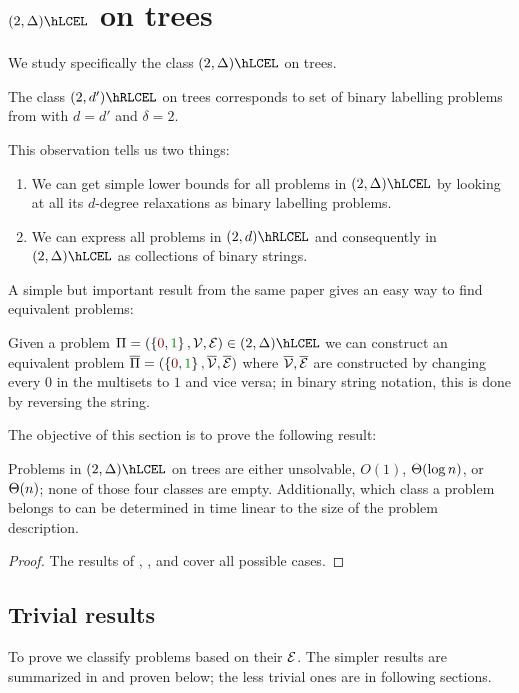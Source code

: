 \documentclass[12pt,a4paper]{article}
\begin{document}
\section{\texorpdfstring{$(2,\Delta)\hLCEL$}{2,delta-LCEL} on trees}
We study specifically the class $(2,\Delta)\hLCEL$ on trees.
\begin{obs}
    The class $(2,d')\hRLCEL$ on trees corresponds to set of binary labelling problems from \cite{balliu-2019} with $d=d'$ and $\delta=2$. 
\end{obs}
This observation tells us two things:
\begin{enumerate}
    \item We can get simple lower bounds for all problems in $(2,\Delta)\hLCEL$ by looking at all its $d$-degree relaxations as binary labelling problems.
    \item We can express all problems in $(2,d)\hRLCEL$ and consequently in $(2,\Delta)\hLCEL$ as collections of binary strings.
\end{enumerate}
A simple but important result from the same paper gives an easy way to find equivalent problems:
\begin{lem}\label{lem:equiv}
    Given a problem $\Pi=(\Set{\n,\y},\Vc,\Ec)\in(2,\Delta)\hLCEL$ we can construct an equivalent problem $\overline{\Pi}=(\Set{\n,\y},\overline{\Vc},\overline{\Ec})$ where $\overline{\mathcal{V}},\overline{\mathcal{E}}$ are constructed by changing every $0$ in the multisets to $1$ and vice versa; in binary string notation, this is done by reversing the string.
\end{lem}
The objective of this section is to prove the following result:
\begin{thm}\label{thm:class}
Problems in $(2,\Delta)\hLCEL$ on trees are either unsolvable, $O(1)$, $\Theta(\log n)$, or $\Theta(n)$; none of those four classes are empty. Additionally, which class a problem belongs to can be determined in time linear to the size of the problem description.
\end{thm}
\begin{proof}
    The results of , ,  and  cover all possible cases.
\end{proof}
\subsection{Trivial results}\label{sec:trivial}
To prove  we classify problems based on their $\mathcal{E}$. The simpler results are summarized in  and proven below; the less trivial ones are in following sections.

\end{document}
